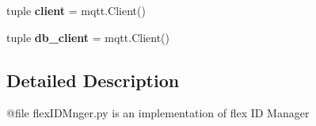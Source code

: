 \begin{DoxyCompactItemize}
\item 
\hypertarget{namespaceflexIDMnger_ae8dbf691e3f727b2d0710958a1f989db}{tuple {\bfseries client} = mqtt.\-Client()}\label{namespaceflexIDMnger_ae8dbf691e3f727b2d0710958a1f989db}

\item 
\hypertarget{namespaceflexIDMnger_a1bc18fe7ec1b8161813483087052108b}{tuple {\bfseries db\-\_\-client} = mqtt.\-Client()}\label{namespaceflexIDMnger_a1bc18fe7ec1b8161813483087052108b}

\end{DoxyCompactItemize}


\subsection{Detailed Description}
\begin{DoxyVerb}@file flexIDMnger.py is an implementation of flex ID Manager
\end{DoxyVerb}
 

